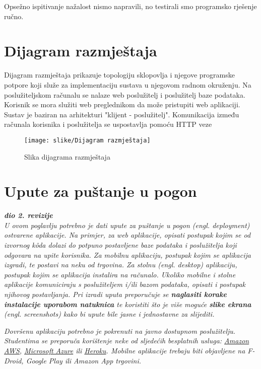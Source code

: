 			Opsežno ispitivanje nažalost nismo napravili, no testirali smo programsko rješenje ručno.
			
			
			\eject 
		
		
		\section{Dijagram razmještaja}
			
			Dijagram razmještaja prikazuje topologiju sklopovlja i njegove programske potpore koji služe za implementaciju sustava u njegovom radnom okruženju. Na poslužiteljskom računalu se nalaze web poslužitelj i poslužitelj baze podataka. Korisnik se mora služiti web preglednikom da može pristupiti web aplikaciji. Sustav je baziran na arhitekturi "klijent - poslužitelj". Komunikacija između računala korisnika i poslužitelja se uspostavlja pomoću HTTP veze
			 \begin{figure}[hbt!]
			 	\centering
			 	\texttt{[image: slike/Dijagram razmještaja]}
			 	\caption{Slika dijagrama razmještaja}
			 	\label{fig:razmjestaj}
			 \end{figure}
			
			\eject 
		
		\section{Upute za puštanje u pogon}
		
			\textbf{\textit{dio 2. revizije}}\\
		
			 \textit{U ovom poglavlju potrebno je dati upute za puštanje u pogon (engl. deployment) ostvarene aplikacije. Na primjer, za web aplikacije, opisati postupak kojim se od izvornog kôda dolazi do potpuno postavljene baze podataka i poslužitelja koji odgovara na upite korisnika. Za mobilnu aplikaciju, postupak kojim se aplikacija izgradi, te postavi na neku od trgovina. Za stolnu (engl. desktop) aplikaciju, postupak kojim se aplikacija instalira na računalo. Ukoliko mobilne i stolne aplikacije komuniciraju s poslužiteljem i/ili bazom podataka, opisati i postupak njihovog postavljanja. Pri izradi uputa preporučuje se \textbf{naglasiti korake instalacije uporabom natuknica} te koristiti što je više moguće \textbf{slike ekrana} (engl. screenshots) kako bi upute bile jasne i jednostavne za slijediti.}
			
			
			 \textit{Dovršenu aplikaciju potrebno je pokrenuti na javno dostupnom poslužitelju. Studentima se preporuča korištenje neke od sljedećih besplatnih usluga: \href{https://aws.amazon.com/}{Amazon AWS}, \href{https://azure.microsoft.com/en-us/}{Microsoft Azure} ili \href{https://www.heroku.com/}{Heroku}. Mobilne aplikacije trebaju biti objavljene na F-Droid, Google Play ili Amazon App trgovini.}
			
			
			\eject 